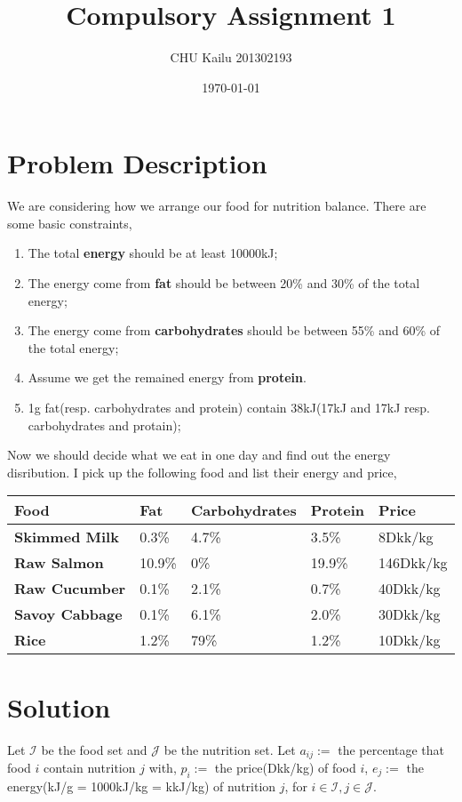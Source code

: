 \documentclass[10pt]{article}
\title{Compulsory Assignment 1}
\author{CHU Kailu 201302193}
\date{\today}
\begin{document}
\maketitle

\section{Problem Description}
We are considering how we arrange our food for nutrition balance.
There are some basic constraints, 

\begin{enumerate}
\item The total \textbf{energy} should be at least 10000kJ;
\item The energy come from \textbf{fat} should be between 20\% and 30\% of the total energy;
\item The energy come from \textbf{carbohydrates} should be between 55\% and 60\% of the total energy;
\item Assume we get the remained energy from \textbf{protein}.
\item 1g fat(resp. carbohydrates and protein) contain 38kJ(17kJ and 17kJ resp. carbohydrates and protain);
\end{enumerate}

Now we should decide what we eat in one day and find out the energy disribution. 
I pick up the following food and list their energy and price,

\begin{center}\begin{tabular}{|l|l|l|l|l|}
\hline
Food & Fat & Carbohydrates & Protein & Price \\
\hline
\textbf{Skimmed Milk} & 0.3\% & 4.7\% & 3.5\% & 8Dkk/kg \\
\hline
\textbf{Raw Salmon} & 10.9\% & 0\% & 19.9\% & 146Dkk/kg \\
\hline
\textbf{Raw Cucumber} & 0.1\% & 2.1\% & 0.7\% & 40Dkk/kg \\
\hline
\textbf{Savoy Cabbage} & 0.1\% & 6.1\% & 2.0\% & 30Dkk/kg \\
\hline
\textbf{Rice} & 1.2\% & 79\% & 1.2\% & 10Dkk/kg\\
\hline 
\end{tabular}\end{center}


\section{Solution}
Let $\mathcal{I}$ be the food set and $\mathcal{J}$ be the nutrition set.
Let $a_{ij} :=$ the percentage that food $i$ contain nutrition $j$ with,
$p_i:=$ the price(Dkk/kg) of food $i$, 
$e_j:=$ the energy(kJ/g = 1000kJ/kg = kkJ/kg) of nutrition $j$,
for $i\in \mathcal{I},j\in \mathcal{J}$.
\end{document}
